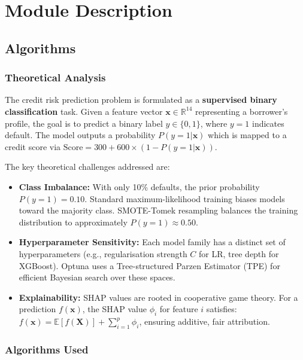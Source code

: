 \documentclass[12pt,a4paper]{report}
\begin{document}
\section{Module Description}

\subsection{Algorithms}

\subsubsection{Theoretical Analysis}

The credit risk prediction problem is formulated as a \textbf{supervised binary classification} task. Given a feature vector $\mathbf{x} \in \mathbb{R}^{14}$ representing a borrower's profile, the goal is to predict a binary label $y \in \{0, 1\}$, where $y = 1$ indicates default. The model outputs a probability $P(y=1|\mathbf{x})$ which is mapped to a credit score via $\text{Score} = 300 + 600 \times (1 - P(y=1|\mathbf{x}))$.

The key theoretical challenges addressed are:
\begin{itemize}
    \item \textbf{Class Imbalance:} With only 10\% defaults, the prior probability $P(y=1) = 0.10$. Standard maximum-likelihood training biases models toward the majority class. SMOTE-Tomek resampling balances the training distribution to approximately $P(y=1) \approx 0.50$.
    \item \textbf{Hyperparameter Sensitivity:} Each model family has a distinct set of hyperparameters (e.g., regularisation strength $C$ for LR, tree depth for XGBoost). Optuna uses a Tree-structured Parzen Estimator (TPE) for efficient Bayesian search over these spaces.
    \item \textbf{Explainability:} SHAP values are rooted in cooperative game theory. For a prediction $f(\mathbf{x})$, the SHAP value $\phi_i$ for feature $i$ satisfies: $f(\mathbf{x}) = \mathbb{E}[f(\mathbf{X})] + \sum_{i=1}^{p} \phi_i$, ensuring additive, fair attribution.
\end{itemize}

\subsubsection{Algorithms Used}
\end{document}
